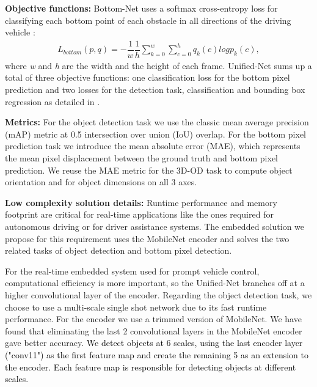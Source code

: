 \documentclass[10pt,twocolumn,letterpaper]{article}
\begin{document}
\textbf{Objective functions: } Bottom-Net uses a softmax cross-entropy loss for classifying each bottom point of each obstacle in all directions of the driving vehicle : 
\begin{equation}
\begin{aligned}
L_{bottom}(p, q) = -\dfrac{1}{w} \dfrac{1}{h}\sum_{k=0}^{w} \sum_{c=0}^{h} q_k(c)log p_k(c),
\end{aligned}
\end{equation}
where \textit{w} and \textit{h} are the width and the height of each frame.
Unified-Net sums up a total of three objective functions: one classification loss for the bottom pixel prediction and two losses for the detection task, classification and bounding box regression as detailed in \cite{faster}.

\textbf{Metrics: }
For the object detection task we use the classic mean average precision (mAP) metric at 0.5 intersection over union (IoU) overlap. For the bottom pixel prediction task we introduce the mean absolute error (MAE), which represents the mean pixel displacement between the ground truth and bottom pixel prediction.
We reuse the MAE metric for the 3D-OD task to compute object orientation and for object dimensions on all 3 axes.


\textbf{Low complexity solution details: }
Runtime performance and memory footprint are critical for real-time applications like the ones required for autonomous driving or for driver assistance systems. The embedded solution we propose for this requirement uses the MobileNet encoder and solves the two related tasks of object detection and bottom pixel detection. 

For the real-time embedded system used for prompt vehicle control, computational efficiency is more important, so the Unified-Net branches off at a higher convolutional layer of the encoder. Regarding the object detection task, we choose to use a multi-scale single shot network due to its fast runtime performance. For the encoder we use a trimmed version of MobileNet. We have found that eliminating the last 2 convolutional layers in the MobileNet encoder gave better accuracy. \textcolor{black}{
We detect objects at 6 scales, using the last encoder layer ("conv11") as the first feature map and create the remaining 5 as an extension to the encoder. Each feature map is responsible for detecting objects at different scales.
}
\end{document}
